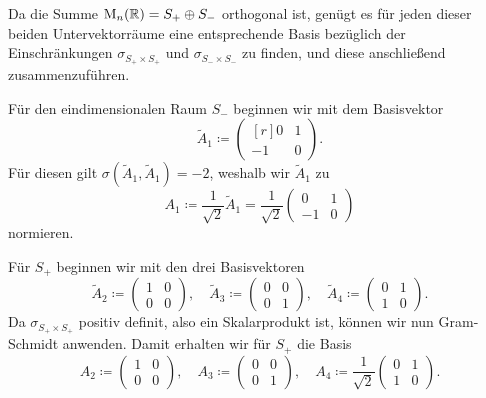 \documentclass[a4paper, 10pt]{scrartcl}
\begin{document}
\begin{solution}
\begin{enumerate}[leftmargin=*]
      Da die Summe $\mathrm{M}_n(\mathbb{R}) = S_+ \oplus S_-$ orthogonal ist, genügt es für jeden dieser beiden Untervektorräume eine entsprechende Basis bezüglich der Einschränkungen $\sigma_{S_+ \times S_+}$ und $\sigma_{S_- \times S_-}$ zu finden, und diese anschließend zusammenzuführen.
      
      Für den eindimensionalen Raum $S_-$ beginnen wir mit dem Basisvektor
      \[
        \tilde{A}_1
        \coloneqq
        \begin{pmatrix*}[r]
           0  & 1 \\
          -1  & 0
        \end{pmatrix*}.
      \]
      Für diesen gilt $\sigma(\tilde{A}_1, \tilde{A}_1) = -2$, weshalb wir $\tilde{A}_1$ zu
      \[
        A_1
        \coloneqq
        \frac{1}{\sqrt{2}}
        \tilde{A}_1
        =
        \frac{1}{\sqrt{2}}
        \begin{pmatrix}
           0  & 1 \\
          -1  & 0
        \end{pmatrix}
      \]
      normieren.
      
      Für $S_+$ beginnen wir mit den drei Basisvektoren
      \[
        \tilde{A}_2
        \coloneqq
        \begin{pmatrix}
          1 & 0 \\
          0 & 0
        \end{pmatrix},
        \quad
        \tilde{A}_3
        \coloneqq
        \begin{pmatrix}
          0 & 0 \\
          0 & 1
        \end{pmatrix},
        \quad
        \tilde{A}_4
        \coloneqq
        \begin{pmatrix}
          0 & 1 \\
          1 & 0
        \end{pmatrix}.
      \]
      Da $\sigma_{S_+ \times S_+}$ positiv definit, also ein Skalarprodukt ist, können wir nun Gram-Schmidt anwenden.
      Damit erhalten wir für $S_+$ die Basis
      \[
        A_2
        \coloneqq
        \begin{pmatrix}
          1 & 0 \\
          0 & 0
        \end{pmatrix},
        \quad
        A_3
        \coloneqq
        \begin{pmatrix}
          0 & 0 \\
          0 & 1
        \end{pmatrix},
        \quad
        A_4
        \coloneqq
        \frac{1}{\sqrt{2}}
        \begin{pmatrix}
          0 & 1 \\
          1 & 0
        \end{pmatrix}.
      \]
      

\end{enumerate}
\end{solution}
\end{document}

